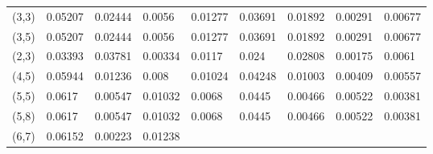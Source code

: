 \documentclass[10pt,twosided]{article}
\numberwithin{equation}{section}
\numberwithin{equation}{section}
\begin{document}
\begin{table}
\begin{tabular}{|p{41pt}|p{32pt}|p{38pt}|p{32pt}|p{38pt}|p{32pt}|p{38pt}|p{32pt}|p{38pt}|}
{} \\
\hline
\parbox{41pt}{\raggedright
(3,3)
} & \parbox{32pt}{\raggedright
0.05207
} & \parbox{38pt}{\raggedright
0.02444
} & \parbox{32pt}{\raggedright
0.0056
} & \parbox{38pt}{\raggedright
0.01277
} & \parbox{32pt}{\raggedright
0.03691
} & \parbox{38pt}{\raggedright
0.01892
} & \parbox{32pt}{\raggedright
0.00291
} & \parbox{38pt}{\raggedright
0.00677
} \\
\hline
\parbox{41pt}{\raggedright
(3,5)
} & \parbox{32pt}{\raggedright
0.05207
} & \parbox{38pt}{\raggedright
0.02444
} & \parbox{32pt}{\raggedright
0.0056
} & \parbox{38pt}{\raggedright
0.01277
} & \parbox{32pt}{\raggedright
0.03691
} & \parbox{38pt}{\raggedright
0.01892
} & \parbox{32pt}{\raggedright
0.00291
} & \parbox{38pt}{\raggedright
0.00677
} \\
\hline
\parbox{41pt}{\raggedright
(2,3)
} & \parbox{32pt}{\raggedright
0.03393
} & \parbox{38pt}{\raggedright
0.03781
} & \parbox{32pt}{\raggedright
0.00334
} & \parbox{38pt}{\raggedright
0.0117
} & \parbox{32pt}{\raggedright
0.024
} & \parbox{38pt}{\raggedright
0.02808
} & \parbox{32pt}{\raggedright
0.00175
} & \parbox{38pt}{\raggedright
0.0061
} \\
\hline
\parbox{41pt}{\raggedright
(4,5)
} & \parbox{32pt}{\raggedright
0.05944
} & \parbox{38pt}{\raggedright
0.01236
} & \parbox{32pt}{\raggedright
0.008
} & \parbox{38pt}{\raggedright
0.01024
} & \parbox{32pt}{\raggedright
0.04248
} & \parbox{38pt}{\raggedright
0.01003
} & \parbox{32pt}{\raggedright
0.00409
} & \parbox{38pt}{\raggedright
0.00557
} \\
\hline
\parbox{41pt}{\raggedright
(5,5)
} & \parbox{32pt}{\raggedright
0.0617
} & \parbox{38pt}{\raggedright
0.00547
} & \parbox{32pt}{\raggedright
0.01032
} & \parbox{38pt}{\raggedright
0.0068
} & \parbox{32pt}{\raggedright
0.0445
} & \parbox{38pt}{\raggedright
0.00466
} & \parbox{32pt}{\raggedright
0.00522
} & \parbox{38pt}{\raggedright
0.00381
} \\
\hline
\parbox{41pt}{\raggedright
(5,8)
} & \parbox{32pt}{\raggedright
0.0617
} & \parbox{38pt}{\raggedright
0.00547
} & \parbox{32pt}{\raggedright
0.01032
} & \parbox{38pt}{\raggedright
0.0068
} & \parbox{32pt}{\raggedright
0.0445
} & \parbox{38pt}{\raggedright
0.00466
} & \parbox{32pt}{\raggedright
0.00522
} & \parbox{38pt}{\raggedright
0.00381
} \\
\hline
\parbox{41pt}{\raggedright
(6,7)
} & \parbox{32pt}{\raggedright
0.06152
} & \parbox{38pt}{\raggedright
0.00223
} & \parbox{32pt}{\raggedright
0.01238
} & \parbox{38pt}{\raggedright
}
\end{tabular}
\end{table}
\end{document}
